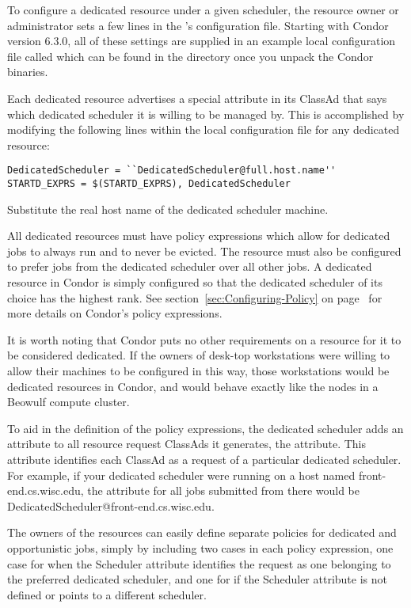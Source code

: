 To configure a dedicated resource under a given scheduler, the
resource owner or administrator sets a few lines in the
's configuration file.
Starting with Condor version 6.3.0, all of these settings are supplied
in an example local configuration file called
 which can be found in
the  directory once you unpack the Condor binaries.

Each dedicated resource advertises a special attribute in its ClassAd
that says which dedicated scheduler it is willing to be managed by.
This is accomplished by modifying the following lines within the local
configuration file for any dedicated resource:

\begin{verbatim}
DedicatedScheduler = ``DedicatedScheduler@full.host.name''
STARTD_EXPRS = $(STARTD_EXPRS), DedicatedScheduler
\end{verbatim}

Substitute the real host name of the dedicated scheduler
machine. 

All dedicated resources must have policy expressions which allow for
dedicated jobs to always run and to never be evicted.
The resource must also be configured to prefer jobs from the dedicated 
scheduler over all other jobs.
A dedicated resource in Condor is simply configured so that the
dedicated scheduler of its choice has the highest rank.
See section~\ref{sec:Configuring-Policy} on
page~\pageref{sec:Configuring-Policy} 
for more details on Condor's policy expressions. 

It is worth noting that Condor puts no other requirements on a
resource for it to be considered dedicated.  
If the owners of desk-top workstations were willing to allow their
machines to be configured in this way, those workstations would be
dedicated resources in Condor, and would behave exactly like the nodes
in a Beowulf compute cluster.

To aid in the definition of the policy expressions, the dedicated
scheduler adds an attribute to all resource request ClassAds it
generates, the  attribute.
This attribute identifies each ClassAd as a request of a particular
dedicated scheduler.
For example, if your dedicated scheduler were running on a host named
front-end.cs.wisc.edu, the  attribute for all jobs
submitted from there would be
DedicatedScheduler@front-end.cs.wisc.edu. 

The owners of the resources can easily define separate policies for
dedicated and opportunistic jobs, simply by including two cases in
each policy expression, one case for when the Scheduler attribute
identifies the request as one belonging to the preferred dedicated
scheduler, and one for if the Scheduler attribute is not defined or
points to a different scheduler.

